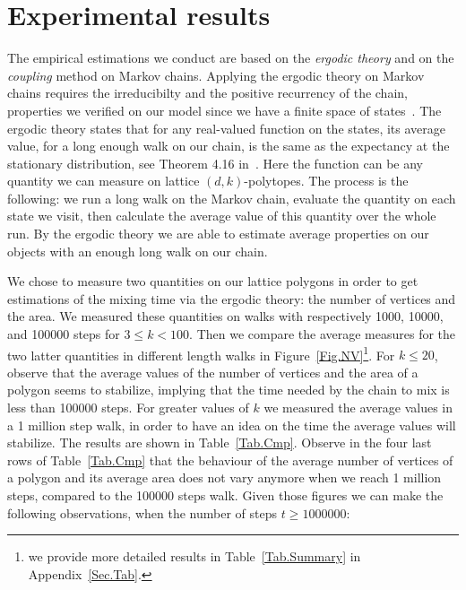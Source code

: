 \documentclass[a4paper]{article}
\newtheorem{theorem}{Theorem}
\begin{document}



\section{Experimental results}\label{Sec.Res}

The empirical estimations we conduct are based on the \textit{ergodic theory} and on the \textit{coupling} method on Markov chains. Applying the ergodic theory on Markov chains requires the irreducibilty and the positive recurrency of the chain, properties we verified on our model since we have a finite space of states~\cite{levin2009markov}. The ergodic theory states that for any real-valued function on the states, its average value, for a long enough  walk on our chain, is the same as the expectancy at the stationary distribution, see Theorem 4.16 in~\cite{levin2009markov}. Here the function can be any quantity we can measure on lattice $(d,k)$-polytopes. The process is the following: we run a long walk on the Markov chain, evaluate the quantity on each state we visit, then calculate the average value of this quantity over the whole run. By the ergodic theory we are able to estimate average properties on our objects with an enough long walk on our chain.

We chose to measure two quantities on our lattice polygons in order to get estimations of the mixing time via the ergodic theory: the number of vertices and the area. We measured these quantities on walks with respectively 1000, 10000, and 100000 steps for $3\leq{k}<100$. Then we compare the average measures for the two latter quantities in different length walks in Figure~\ref{Fig.NV}\footnote{we provide more detailed results in Table~\ref{Tab.Summary} in Appendix~\ref{Sec.Tab}.}. For $k\leq 20$, observe that the average values of the number of vertices and the area of a polygon seems to stabilize, implying that the time needed by the chain to mix is less than 100000 steps. For greater values of $k$ we measured the average values in a 1 million step walk, in order to have an idea on the time the average values will stabilize. The results are shown in Table~\ref{Tab.Cmp}. Observe in the four last rows of Table~\ref{Tab.Cmp} that the behaviour of the average number of vertices of a polygon and its average area does not vary anymore when we reach 1 million steps, compared to the 100000 steps walk. Given those figures we can make the following observations, when the number of steps $t\geq 1000000$:
\end{document}
